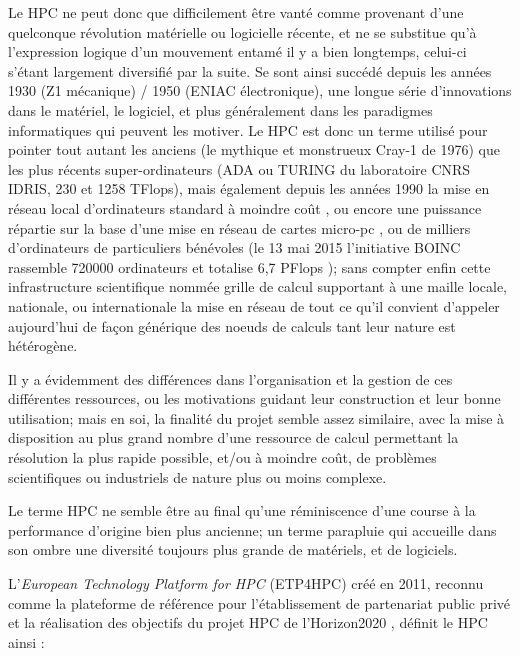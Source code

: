 Le HPC ne peut donc que difficilement être vanté comme provenant d'une quelconque révolution matérielle ou logicielle récente, et ne se substitue qu'à l'expression logique d'un mouvement entamé il y a bien longtemps, celui-ci s'étant largement diversifié par la suite. Se sont ainsi succédé depuis les années 1930 (Z1 mécanique) / 1950 (ENIAC électronique), une longue série d'innovations dans le matériel, le logiciel, et plus généralement dans les paradigmes informatiques qui peuvent les motiver. Le HPC est donc un terme utilisé pour pointer tout autant les anciens (le mythique et monstrueux Cray-1 de 1976) que les plus récents super-ordinateurs (ADA ou TURING du laboratoire CNRS IDRIS, 230 et 1258 TFlops), mais également depuis les années 1990 la mise en réseau local d'ordinateurs standard à moindre coût , ou encore une puissance répartie sur la base d'une mise en réseau de cartes micro-pc , ou de milliers d'ordinateurs de particuliers bénévoles (le 13 mai 2015 l'initiative BOINC rassemble 720000 ordinateurs et totalise 6,7 PFlops ); sans compter enfin cette infrastructure scientifique nommée grille de calcul supportant à une maille locale, nationale, ou internationale la mise en réseau de tout ce qu'il convient d'appeler aujourd'hui de façon générique des noeuds de calculs tant leur nature est hétérogène.

Il y a évidemment des différences dans l'organisation et la gestion de ces différentes ressources, ou les motivations guidant leur construction et leur bonne utilisation; mais en soi, la finalité du projet semble assez similaire, avec la mise à disposition au plus grand nombre d'une ressource de calcul permettant la résolution la plus rapide possible, et/ou à moindre coût, de problèmes scientifiques ou industriels de nature plus ou moins complexe.

Le terme HPC ne semble être au final qu'une réminiscence d'une course à la performance d'origine bien plus ancienne; un terme parapluie qui accueille dans son ombre une diversité toujours plus grande de matériels, et de logiciels.

L'\textit{European Technology Platform for HPC} (ETP4HPC) créé en 2011, reconnu comme la plateforme de référence pour l'établissement de partenariat public privé et la réalisation des objectifs du projet HPC de l'Horizon2020 \autocite{ETP4HPC2013}, définit le HPC ainsi :

